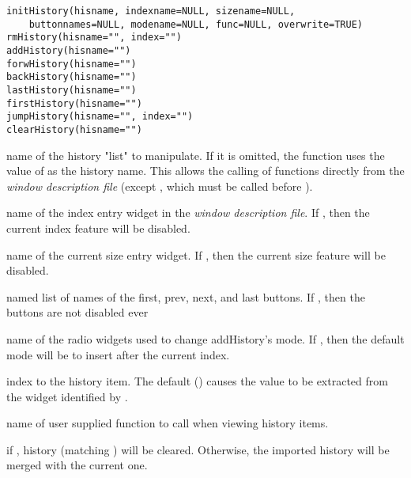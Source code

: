 \documentclass[letterpaper]{book}
\begin{document}
%
\begin{Usage}
\begin{verbatim}
initHistory(hisname, indexname=NULL, sizename=NULL,
    buttonnames=NULL, modename=NULL, func=NULL, overwrite=TRUE)
rmHistory(hisname="", index="")
addHistory(hisname="")
forwHistory(hisname="")
backHistory(hisname="")
lastHistory(hisname="")
firstHistory(hisname="")
jumpHistory(hisname="", index="")
clearHistory(hisname="")
\end{verbatim}
\end{Usage}
%
\begin{Arguments}
\begin{ldescription}
\item[\code{hisname}] name of the history "list" to manipulate. If it is omitted, 
the function uses the value of  as the history name. 
This allows the calling of functions directly from the \emph{window description file} 
(except , which must be called before ).
\item[\code{indexname}] name of the index entry widget in the \emph{window description file}. 
If , then the current index feature will be disabled.
\item[\code{sizename}] name of the current size entry widget. If , then the 
current size feature will be disabled.
\item[\code{buttonnames}] named list of names of the first, prev, next, and last buttons. If , then the 
buttons are not disabled ever
\item[\code{modename}] name of the radio widgets used to change addHistory\bsl{}'s mode. If , then the 
default mode will be to insert after the current index.
\item[\code{index}] index to the history item. The default () causes the value to be 
extracted from the widget identified by .
\item[\code{func}] name of user supplied function to call when viewing history items.
\item[\code{overwrite}] if , history (matching ) will be cleared. 
Otherwise, the imported history will be merged with the current one.
\end{ldescription}
\end{Arguments}
%
\end{document}
